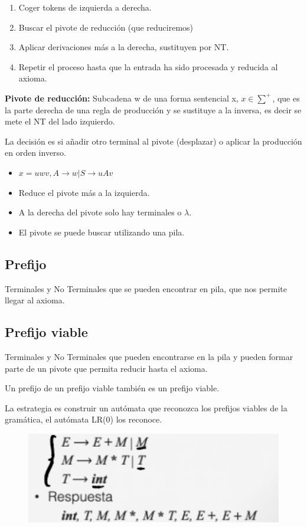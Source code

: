\documentclass[12pt, twoside, openright]{report} %
\begin{document}
\begin{enumerate}
  \item Coger tokens de izquierda a derecha.
  \item Buscar el pivote de reducción (que reduciremos)
  \item Aplicar derivaciones más a la derecha, sustituyen por NT.
  \item Repetir el proceso hasta que la entrada ha sido procesada y reducida al axioma.
\end{enumerate}

\textbf{Pivote de reducción:} Subcadena w de una forma sentencial x, $x \in \sum^+$, que es la parte derecha de una regla de producción y se sustituye a la inversa, es decir se mete el NT del lado izquierdo. 

La decisión es si añadir otro terminal al pivote (desplazar) o aplicar la producción en orden inverso.
\begin{itemize}
  \item $x=uwv, A \rightarrow w | S \rightarrow uAv$
  \item Reduce el pivote más a la izquierda.
  \item A la derecha del pivote solo hay terminales o $\lambda$.
  \item El pivote se puede buscar utilizando una pila.
\end{itemize}

\subsection{Prefijo} 
Terminales y No Terminales que se pueden encontrar en pila, que nos permite llegar al axioma.

\subsection{Prefijo viable} 
Terminales y No Terminales que pueden encontrarse en la pila y pueden formar parte de un pivote que permita reducir hasta el axioma. 

Un prefijo de un prefijo viable también es un prefijo viable.

La estrategia es construir un autómata que reconozca los prefijos viables de la gramática, el autómata LR(0) los reconoce.
\vspace{-10px}
\begin{figure}[H]
	{\includegraphics[scale=.4]{2021-03-26 18_27_20-ASintactico.pdf - Foxit Reader.png}}
\end{figure}
  
\end{document}
